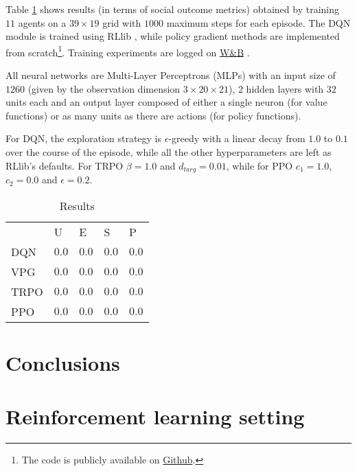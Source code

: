 \documentclass{article}
\begin{document}
Table \ref{table:results} shows results (in terms of social outcome metrics) obtained by training $11$ agents on a $39\times19$ grid with $1000$ maximum steps for each episode. The DQN module is trained using RLlib \cite{rllib}, while policy gradient methods are implemented from scratch\footnote{The code is publicly available on \href{https://github.com/Wadaboa/cpr-appropriation}{Github}.}. Training experiments are logged on \href{https://wandb.ai/wadaboa/cpr-appropriation}{W\&B} \cite{wandb}.

All neural networks are Multi-Layer Perceptrons (MLPs) with an input size of $1260$ (given by the observation dimension $3\times20\times21$), $2$ hidden layers with $32$ units each and an output layer composed of either a single neuron (for value functions) or as many units as there are actions (for policy functions).

For DQN, the exploration strategy is $\epsilon$-greedy with a linear decay from $1.0$ to $0.1$ over the course of the episode, while all the other hyperparameters are left as RLlib's defaults. For TRPO $\beta=1.0$ and $d_{targ}=0.01$, while for PPO $c_1=1.0$, $c_2=0.0$ and $\epsilon=0.2$.

\begin{table}[h]
  \caption{Results}
  \label{table:results}
  \centering
  \begin{tabular}{lllll}
    \toprule
    & U     & E     & S & P \\
    \cmidrule(r){2-5}
    DQN & $0.0$ & $0.0$ & $0.0$ & $0.0$ \\
    VPG & $0.0$ & $0.0$ & $0.0$ & $0.0$ \\
    TRPO & $0.0$ & $0.0$ & $0.0$ & $0.0$ \\
    PPO & $0.0$ & $0.0$ & $0.0$ & $0.0$ \\
    \bottomrule
  \end{tabular}
\end{table}

\section{Conclusions}

\newpage


\newpage
\appendix
\section{Reinforcement learning setting}
\end{document}
